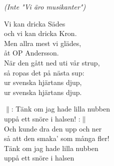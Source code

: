 \documentclass[a6paper, 10pt, twoside]{article}
\begin{document}
\noindent
\begin{center}
    \textit{(Inte "Vi äro musikanter")}
\end{center}
\begin{lyrics}
Vi kan dricka Sädes \\
och vi kan dricka Kron. \\
Men allra mest vi glädes, \\
åt OP Andersson.
\vspace{5pt}\\
När den gått ned uti vår strup, \\
så ropas det på nästa sup: \\
ur svenska hjärtans djup, \\
ur svenska hjärtans djup. 
\end{lyrics}
\vspace{30pt}
\begin{center}
\end{center}
\begin{lyrics}
$\|$: Tänk om jag hade lilla nubben \\
uppå ett snöre i halsen! :$\|$
\vspace{5pt}\\
Och kunde dra den upp och ner \\
så att den smaka' som många fler! \\
Tänk om jag hade lilla nubben \\
uppå ett snöre i halsen 
\end{lyrics}
\end{document}
